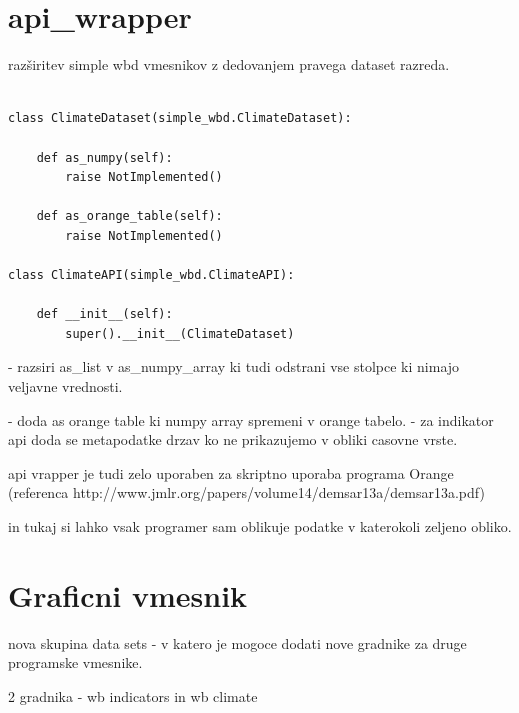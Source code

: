 % 
% 



\section{api\_wrapper}



razširitev simple wbd vmesnikov z dedovanjem pravega dataset razreda.

\begin{verbatim}

class ClimateDataset(simple_wbd.ClimateDataset):
    
    def as_numpy(self):
        raise NotImplemented()
    
    def as_orange_table(self):
        raise NotImplemented()

class ClimateAPI(simple_wbd.ClimateAPI):

    def __init__(self):
        super().__init__(ClimateDataset)
\end{verbatim}


- razsiri as\_list v as\_numpy\_array ki tudi odstrani vse stolpce ki nimajo 
  veljavne vrednosti.

- doda as orange table ki numpy array spremeni v orange tabelo.
  - za indikator api doda se metapodatke drzav ko ne prikazujemo v obliki casovne vrste.


api vrapper je tudi zelo uporaben za skriptno uporaba programa Orange 
(referenca http://www.jmlr.org/papers/volume14/demsar13a/demsar13a.pdf)

in tukaj si lahko vsak programer sam oblikuje podatke v katerokoli zeljeno obliko.






\section{Graficni vmesnik}


 
nova skupina data sets 
 - v katero je mogoce dodati nove gradnike za druge programske vmesnike.

2 gradnika - wb indicators in wb climate

